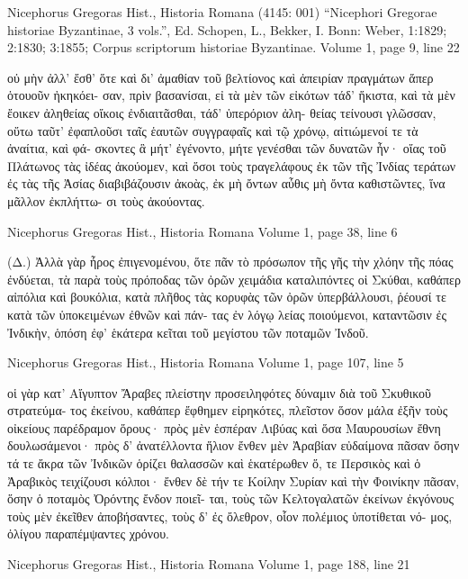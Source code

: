 \documentclass[12pt,letterpaper,twoside,final]{memoir}
\begin{document}
\begin{greek}

Nicephorus Gregoras Hist., Historia Romana (4145: 001)
“Nicephori Gregorae historiae Byzantinae, 3 vols.”, Ed. Schopen, L., Bekker, I.
Bonn: Weber, 1:1829; 2:1830; 3:1855; Corpus scriptorum historiae Byzantinae.
Volume 1, page 9, line 22

                             οὐ μὴν ἀλλ' ἔσθ' ὅτε καὶ δι' ἀμαθίαν 
τοῦ βελτίονος καὶ ἀπειρίαν πραγμάτων ἅπερ ὁτουοῦν ἠκηκόει-
σαν, πρὶν βασανίσαι, εἰ τὰ μὲν τῶν εἰκότων τάδ' ἥκιστα, καὶ 
τὰ μὲν ἔοικεν ἀληθείας οἴκοις ἐνδιαιτᾶσθαι, τάδ' ὑπερόριον ἀλη-
θείας τείνουσι γλῶσσαν, οὕτω ταῦτ' ἐφαπλοῦσι ταῖς ἑαυτῶν 
συγγραφαῖς καὶ τῷ χρόνῳ, αἰτιώμενοί τε τὰ ἀναίτια, καὶ φά-
σκοντες ἃ μήτ' ἐγένοντο, μήτε γενέσθαι τῶν δυνατῶν ἦν· οἵας 
τοῦ Πλάτωνος τὰς ἰδέας ἀκούομεν, καὶ ὅσοι τοὺς τραγελάφους 
ἐκ τῶν τῆς Ἰνδίας τεράτων ἐς τὰς τῆς Ἀσίας διαβιβάζουσιν ἀκοὰς, 
ἐκ μὴ ὄντων αὖθις μὴ ὄντα καθιστῶντες, ἵνα μᾶλλον ἐκπλήττω-
σι τοὺς ἀκούοντας. 



Nicephorus Gregoras Hist., Historia Romana 
Volume 1, page 38, line 6

                 (Δ.) Ἀλλὰ γὰρ ἦρος ἐπιγενομένου, ὅτε πᾶν τὸ 
πρόσωπον τῆς γῆς τὴν χλόην τῆς πόας ἐνδύεται, τὰ παρὰ τοὺς 
πρόποδας τῶν ὀρῶν χειμάδια καταλιπόντες οἱ Σκύθαι, καθάπερ 
αἰπόλια καὶ βουκόλια, κατὰ πλῆθος τὰς κορυφὰς τῶν ὀρῶν 
ὑπερβάλλουσι, ῥέουσί τε κατὰ τῶν ὑποκειμένων ἐθνῶν καὶ πάν-
τας ἐν λόγῳ λείας ποιούμενοι, καταντῶσιν ἐς Ἰνδικὴν, ὁπόση 
ἐφ' ἑκάτερα κεῖται τοῦ μεγίστου τῶν ποταμῶν Ἰνδοῦ. 



Nicephorus Gregoras Hist., Historia Romana 
Volume 1, page 107, line 5

                               οἱ γὰρ κατ' Αἴγυπτον Ἄραβες 
πλείστην προσειληφότες δύναμιν διὰ τοῦ Σκυθικοῦ στρατεύμα-  
τος ἐκείνου, καθάπερ ἔφθημεν εἰρηκότες, πλεῖστον ὅσον μάλα ἐξῆν 
τοὺς οἰκείους παρέδραμον ὅρους· πρὸς μὲν ἑσπέραν Λιβύας καὶ 
ὅσα Μαυρουσίων ἔθνη δουλωσάμενοι· πρὸς δ' ἀνατέλλοντα 
ἥλιον ἔνθεν μὲν Ἀραβίαν εὐδαίμονα πᾶσαν ὅσην τά τε ἄκρα 
τῶν Ἰνδικῶν ὁρίζει θαλασσῶν καὶ ἑκατέρωθεν ὅ, τε Περσικὸς καὶ 
ὁ Ἀραβικὸς τειχίζουσι κόλποι· ἔνθεν δὲ τήν τε Κοίλην Συρίαν 
καὶ τὴν Φοινίκην πᾶσαν, ὅσην ὁ ποταμὸς Ὀρόντης ἔνδον ποιεῖ-
ται, τοὺς τῶν Κελτογαλατῶν ἐκείνων ἐκγόνους τοὺς μὲν ἐκεῖθεν 
ἀποβήσαντες, τοὺς δ' ἐς ὄλεθρον, οἷον πολέμιος ὑποτίθεται νό-
μος, ὀλίγου παραπέμψαντες χρόνου. 


Nicephorus Gregoras Hist., Historia Romana 
Volume 1, page 188, line 21


\end{greek}
\end{document}

